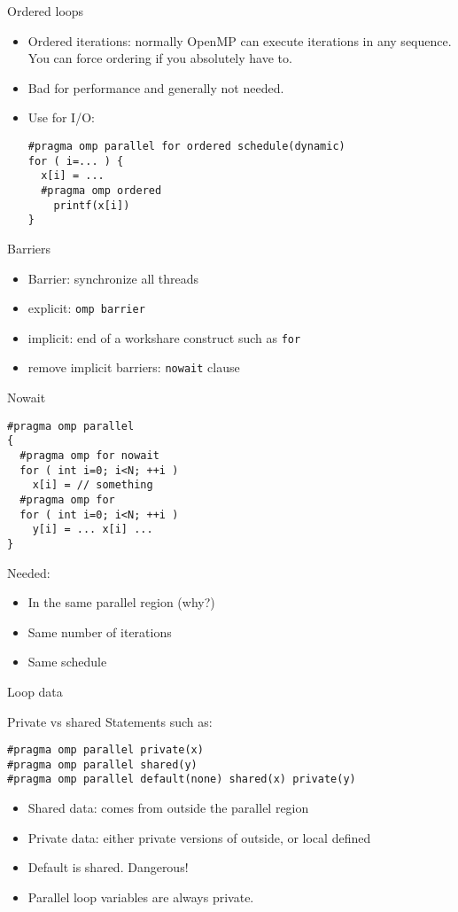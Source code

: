 \begin{numberedframe}{Ordered loops}
  \begin{itemize}
  \item Ordered iterations: normally OpenMP can execute iterations in
    any sequence.
    You can force ordering if you absolutely have to.
  \item Bad for performance and generally not needed.
  \item Use for I/O:
\begin{lstlisting}
#pragma omp parallel for ordered schedule(dynamic)
for ( i=... ) {
  x[i] = ...
  #pragma omp ordered
    printf(x[i])
}
\end{lstlisting}
  \end{itemize}
\end{numberedframe}

\begin{numberedframe}{Barriers}
  \begin{itemize}
  \item Barrier: synchronize all threads
  \item explicit: \lstinline{omp barrier}
  \item implicit: end of a workshare construct such as \lstinline{for}
  \item remove implicit barriers: \lstinline{nowait} clause
  \end{itemize}
\end{numberedframe}

\begin{numberedframe}{Nowait}
\begin{lstlisting}
#pragma omp parallel
{
  #pragma omp for nowait
  for ( int i=0; i<N; ++i )
    x[i] = // something
  #pragma omp for
  for ( int i=0; i<N; ++i )
    y[i] = ... x[i] ...
}
\end{lstlisting}
Needed:
  \begin{itemize}
  \item In the same parallel region (why?)
  \item Same number of iterations
  \item Same schedule
  \end{itemize}
\end{numberedframe}

 {Loop data}

\begin{numberedframe}{Private vs shared}
Statements such as:
\begin{lstlisting}
#pragma omp parallel private(x)
#pragma omp parallel shared(y)
#pragma omp parallel default(none) shared(x) private(y)
\end{lstlisting}
  \begin{itemize}
  \item Shared data: comes from outside the parallel region
  \item Private data: either private versions of outside, or local defined
  \item Default is shared. Dangerous!
  \item Parallel loop variables are always private.
  \end{itemize}
\end{numberedframe}

